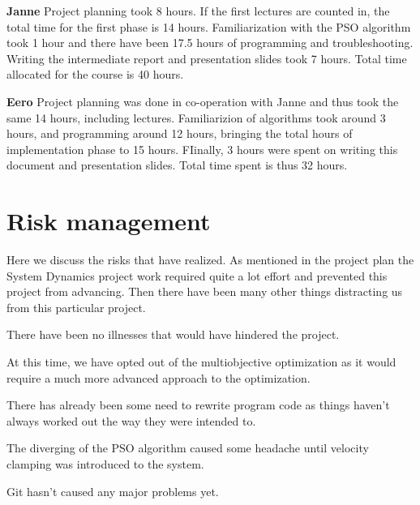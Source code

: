 \documentclass[twoside]{article}
\begin{document}
\begin{multicols}{2}
\textbf{Janne} Project planning took 8 hours. If the first lectures are counted in, the total time for the first phase is 14 hours. Familiarization with the PSO algorithm took 1 hour and there have been 17.5 hours of programming and troubleshooting. Writing the intermediate report and presentation slides took 7 hours. Total time allocated for the course is 40 hours.

\textbf{Eero} Project planning was done in co-operation with Janne and thus took the same 14 hours, including lectures. Familiarizion of algorithms took around 3 hours,  and programming around 12 hours, bringing the total hours of implementation phase to 15 hours. FIinally, 3 hours were spent on writing this document and presentation slides. Total time spent is thus 32 hours.








\section{Risk management}

Here we discuss the risks that have realized. As mentioned in the project plan the System Dynamics project work required quite a lot effort and prevented this project from advancing. Then there have been many other things distracting us from this particular project.

There have been no illnesses that would have hindered the project.

At this time, we have opted out of the multiobjective optimization as it would require a much more advanced approach to the optimization.

There has already been some need to rewrite program code as things haven't always worked out the way they were intended to.

The diverging of the PSO algorithm caused some headache until velocity clamping was introduced to the system. 

Git hasn't caused any major problems yet.



\begin{thebibliography}{99} %


\end{thebibliography}
\end{multicols}
\end{document}
